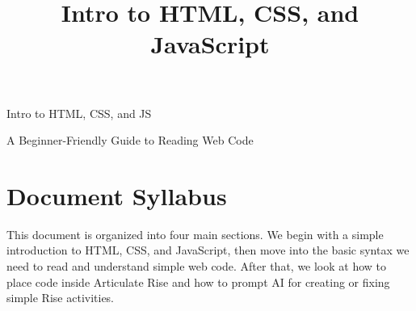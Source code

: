 \documentclass{article}
\title{\textcolor{naranja}{\Bitter Intro to HTML, CSS, and JavaScript}}
\begin{document}
\begin{titlepage}
  \centering
  \vspace*{\fill}

  {\Huge\Bitter\textcolor{naranja}{Intro to HTML, CSS, and JS}\par}

  \vspace{0.4cm}

  {\Large\textcolor{morado}{A Beginner-Friendly Guide to Reading Web Code}\par}

  \vspace*{\fill}
\end{titlepage}

\vspace{-0.5cm}

\section*{\Bitter\textcolor{naranja}{Document Syllabus}}

This document is organized into four main sections. We begin with a simple introduction to HTML, CSS, and JavaScript, then move into the basic syntax we need to read and understand simple web code. After that, we look at how to place code inside Articulate Rise and how to prompt AI for creating or fixing simple Rise activities.

\vspace{0.25cm}
\end{document}
